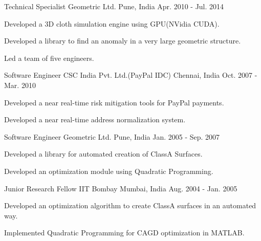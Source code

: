 \begin{cventries}
  \cventry
    {Technical Specialist} %
    {Geometric Ltd.} %
    {Pune, India} %
    {Apr. 2010 - Jul. 2014} %
    {
      \begin{cvitems} %
        \item {Developed a 3D cloth simulation engine using GPU(NVidia CUDA).}
        \item {Developed a library to find an anomaly in a very large geometric structure.}
        \item {Led a team of five engineers.}
      \end{cvitems}
    }

  \cventry
    {Software Engineer} %
    {CSC India Pvt. Ltd.(PayPal IDC)} %
    {Chennai, India} %
    {Oct. 2007 - Mar. 2010} %
    {
      \begin{cvitems} %
        \item {Developed a near real-time risk mitigation tools for PayPal payments.}
        \item {Developed a near real-time address normalization system.}
      \end{cvitems}
    }

  \cventry
    {Software Engineer} %
    {Geometric Ltd.} %
    {Pune, India} %
    {Jan. 2005 - Sep. 2007} %
    {
      \begin{cvitems} %
        \item {Developed a library for automated creation of ClassA Surfaces.}
        \item {Developed an optimization module using Quadratic Programming.} 
      \end{cvitems}
    }

  \cventry
    {Junior Research Fellow} %
    {IIT Bombay} %
    {Mumbai, India} %
    {Aug. 2004 - Jan. 2005} %
    {
      \begin{cvitems} %
        \item {Developed an optimization algorithm to create ClassA surfaces in an automated way.}
        \item {Implemented Quadratic Programming for CAGD optimization in MATLAB.}
      \end{cvitems}
    }
\end{cventries}
